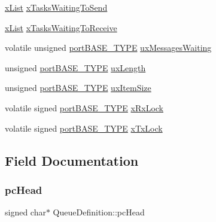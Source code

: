 \begin{DoxyCompactItemize}
\begin{tabbing}
\end{tabbing}\item 
\mbox{\hyperlink{list_8h_a3cee7d8d40380f66ac73b8825b5a0fb0}{x\+List}} \mbox{\hyperlink{struct_queue_definition_a073ad0a31a51508395efd54599c73ee1}{x\+Tasks\+Waiting\+To\+Send}}
\item 
\mbox{\hyperlink{list_8h_a3cee7d8d40380f66ac73b8825b5a0fb0}{x\+List}} \mbox{\hyperlink{struct_queue_definition_a3f26a41f0c0d17fc4645905b309b33aa}{x\+Tasks\+Waiting\+To\+Receive}}
\item 
volatile unsigned \mbox{\hyperlink{portmacro_8h_a1ebe82d24d764ae4e352f7c3a9f92c01}{port\+B\+A\+S\+E\+\_\+\+T\+Y\+PE}} \mbox{\hyperlink{struct_queue_definition_a8e3b24b25631daa65cc8b860346013e3}{ux\+Messages\+Waiting}}
\item 
unsigned \mbox{\hyperlink{portmacro_8h_a1ebe82d24d764ae4e352f7c3a9f92c01}{port\+B\+A\+S\+E\+\_\+\+T\+Y\+PE}} \mbox{\hyperlink{struct_queue_definition_af1edbb7426dad16a57e1fc6bb475bc7e}{ux\+Length}}
\item 
unsigned \mbox{\hyperlink{portmacro_8h_a1ebe82d24d764ae4e352f7c3a9f92c01}{port\+B\+A\+S\+E\+\_\+\+T\+Y\+PE}} \mbox{\hyperlink{struct_queue_definition_ad8719a7d6da96299b7ed158a621ae7e5}{ux\+Item\+Size}}
\item 
volatile signed \mbox{\hyperlink{portmacro_8h_a1ebe82d24d764ae4e352f7c3a9f92c01}{port\+B\+A\+S\+E\+\_\+\+T\+Y\+PE}} \mbox{\hyperlink{struct_queue_definition_a55d7241c91d75f3bf4ad4032aeaaf824}{x\+Rx\+Lock}}
\item 
volatile signed \mbox{\hyperlink{portmacro_8h_a1ebe82d24d764ae4e352f7c3a9f92c01}{port\+B\+A\+S\+E\+\_\+\+T\+Y\+PE}} \mbox{\hyperlink{struct_queue_definition_a393aeeb16596b1be505014b57158c995}{x\+Tx\+Lock}}
\end{DoxyCompactItemize}


\subsection{Field Documentation}
\mbox{\label{struct_queue_definition_ae27bcbc6d35f837dedc62321501daa49}} 
\subsubsection{\texorpdfstring{pc\+Head}{pcHead}}
{\footnotesize\ttfamily signed char$\ast$ Queue\+Definition\+::pc\+Head}

